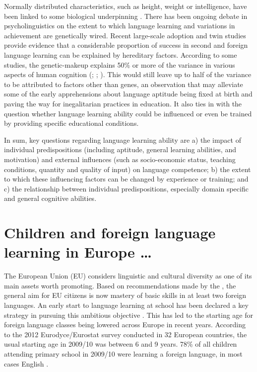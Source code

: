\documentclass[output=paper]{langsci/langscibook}
\begin{document}
Normally distributed characteristics, such as height, weight or intelligence, have been linked to some biological underpinning \citep{Reiterer2019}. There has been ongoing debate in psycholinguistics on the extent to which language learning and variations in achievement are genetically wired. Recent large-scale adoption and twin studies provide evidence that a considerable proportion of success in second and foreign language learning can be explained by hereditary factors. According to some studies, the genetic-makeup explains 50\% or more of the variance in various aspects of human cognition (\citealt{DaleEtAl2010}; \citealt{Stromswold2001}; \citealt{RimfeldEtAl2015}). This would still leave up to half of the variance to be attributed to factors other than genes, an observation that may alleviate some of the early apprehensions about language aptitude being fixed at birth and paving the way for inegalitarian practices in education. It also ties in with the question whether language learning ability could be influenced or even be trained by providing specific educational conditions. 

In sum, key questions regarding language learning ability are a) the impact of individual predispositions (including aptitude, general learning abilities, and motivation) and external influences (such as socio-economic status, teaching conditions, quantity and quality of input) on language competence; b) the extent to which these influencing factors can be changed by experience or training; and c) the relationship between individual predispositions, especially domain specific and general cognitive abilities.  

\section{Children and foreign language learning in Europe …}

The European Union (EU) considers linguistic and cultural diversity as one of its main assets worth promoting. Based on recommendations made by the \citet[19]{BarcelonaEuropeanCouncil2002}, the general aim for EU citizens is now mastery of basic skills in at least two foreign languages. An early start to language learning at school has been declared a key strategy in pursuing this ambitious objective \citep{EuropeanCommission2004}. This has led to the starting age for foreign language classes being lowered across Europe in recent years. According to the 2012 Eurodyce\slash Eurostat survey conducted in 32 European countries, the usual starting age in 2009/10 was between 6 and 9 years. 78\% of all children attending primary school in 2009/10 were learning a foreign language, in most cases English \citep[10f]{Eurostat2012}.
\end{document}
